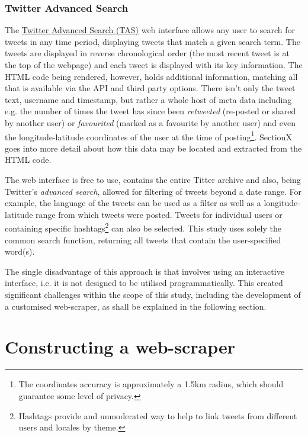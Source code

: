 \documentclass{article}
\begin{document}
\subsubsection{\label{TAS}Twitter Advanced Search}
\label{sec-2-2-3}
The \href{https://twitter.com/search-advanced?lang\%3Den}{Twitter Advanced Search (TAS)} web interface allows any user to search for tweets in any time period, displaying tweets that match a given search term. The tweets are displayed in reverse chronological order (the most recent tweet is at the top of the webpage) and each tweet is displayed with its key information. The HTML code being rendered, however, holds additional information, matching all that is available via the API and third party options. There isn't only the tweet text, username and timestamp, but rather a whole host of meta data including e.g. the number of times the tweet has since been \emph{retweeted} (re-posted or shared by another user) or \emph{favourited} (marked as a favourite by another user) and even the longitude-latitude coordinates of the user at the time of posting\footnote{The coordinates accuracy is approximately a 1.5km radius, which should guarantee some level of privacy.}. SectionX goes into more detail about how this data may be located and extracted from the HTML code.

The web interface is free to use, contains the entire Titter archive and also, being Twitter's \emph{advanced search}, allowed for filtering of tweets beyond a date range. For example, the language of the tweets can be used as a filter as well as a longitude-latitude range from which tweets were posted. Tweets for individual users or containing specific hashtags\footnote{Hashtags provide and unmoderated way to help to link tweets from different users and locales by theme.} can also be selected. This study uses solely the common search function, returning all tweets that contain the user-specified word(s).

The single disadvantage of this approach is that involves using an interactive interface, i.e. it is not designed to be utilised programmatically. This created significant challenges within the scope of this study, including the development of a customised web-scraper, as shall be explained in the following section.


\section{Constructing a web-scraper}
\label{sec-3}
\end{document}
